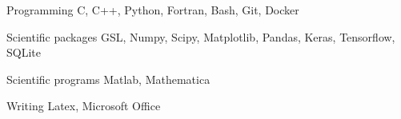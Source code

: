 

\begin{cvskills}

    \cvskill
        {Programming} %
        {C, C++, Python, Fortran, Bash, Git, Docker} %

    \cvskill
        {Scientific packages} %
        {GSL, Numpy, Scipy, Matplotlib, Pandas, Keras, Tensorflow, SQLite} %

    \cvskill
        {Scientific programs} %
        {Matlab, Mathematica} %


    \cvskill
        {Writing} %
        {Latex, Microsoft Office} %

\end{cvskills}